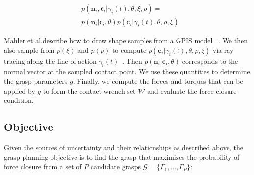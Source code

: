 \documentclass[journal,transmag]{IEEEtran}%
\newcommand{\mG}{\mathcal{G}}
\newcommand{\mW}{\mathcal{W}}
\begin{document}
 \vspace{-2ex}
 \begin{align*}
 &p(\textbf{n}_i,\textbf{c}_i |\gamma_i(t),\theta,\xi,\rho)=\\
 &p(\textbf{n}_i|\textbf{c}_i,\theta)p(\textbf{c}_i|\gamma_i(t),\theta,\rho,\xi)
 \end{align*}

 
Mahler et al.describe how to draw shape samples from a GPIS model ~\cite{mahler2015gp}.
We then also sample from $p(\xi)$ and $p(\rho)$ to compute $p(\textbf{c}_i|\gamma_i(t),\theta,\rho,\xi)$ via ray tracing along the line of action $\gamma_i(t)$~\cite{newcombe2011kinectfusion}.
Then $p(\textbf{n}_i|\textbf{c}_i,\theta)$ corresponds to the normal vector at the sampled contact point.
We use these quantities to determine the grasp parameters $g$.
Finally, we compute the forces and torques that can be applied by $g$ to form the contact wrench set $\mW$ and evaluate the force closure condition.


%



\subsection{Objective}

Given the sources of uncertainty and their relationships as described above, the grasp planning objective is to find the grasp that maximizes the probability of force closure from a set of $P$ candidate grasps $\mG = \{\Gamma_1, ..., \Gamma_P\}$:
\end{document}

